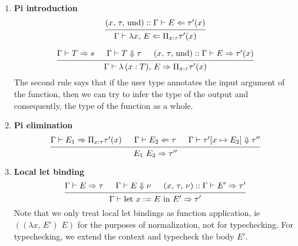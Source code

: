\documentclass{article}
\begin{document}
\begin{enumerate}
\item \textbf{Pi introduction} \\
  \[
    \begin{prooftree}
      \hypo{(x, \, \tau, \, \text{und}) :: \Gamma \vdash E \Leftarrow \tau'(x)}
      \infer1{\Gamma \vdash \lambda x, \, E \Leftarrow \Pi_{x : \tau}\tau'(x)}
    \end{prooftree}
  \]

  \[
    \begin{prooftree}
      \hypo{\Gamma \vdash T \Rightarrow s}
      \hypo{\Gamma \vdash T \Downarrow \tau}
      \hypo{(x, \, \tau, \, \text{und}) :: \Gamma \vdash E \Rightarrow \tau'(x)}
      \infer3{\Gamma \vdash \lambda \, (x : T), \, E \Rightarrow \Pi_{x : \tau}\tau'(x)}
    \end{prooftree}
  \]
  The second rule says that if the user type annotates the input argument of
  the function, then we can try to infer the type of the output and
  consequently, the type of the function as a whole.

\item \textbf{Pi elimination} \\
  \[
    \begin{prooftree}
      \hypo{\Gamma \vdash E_1 \Rightarrow \Pi_{x : \tau}\tau'(x)}
      \hypo{\Gamma \vdash E_2 \Leftarrow \tau}
      \hypo{\Gamma \vdash \tau'[x \mapsto E_2] \Downarrow \tau''}
      \infer3{E_1 \,\, E_2 \Rightarrow \tau''}
    \end{prooftree}
  \]

\item \textbf{Local let binding} \\
  \[
    \begin{prooftree}
      \hypo{\Gamma \vdash E \Rightarrow \tau}
      \hypo{\Gamma \vdash E \Downarrow \nu}
      \hypo{(x, \, \tau, \, \nu) :: \Gamma \vdash E' \Rightarrow \tau'}
      \infer3{\Gamma \vdash \text{let } x := E \text{ in } E' \Rightarrow \tau'}
    \end{prooftree}
  \]
  Note that we only treat local let bindings as function application, ie
  $((\lambda x, \, E') \,\, E)$ for the purposes of normalization, not for 
  typechecking.
  For typechecking, we extend the context and typecheck the body $E'$. 


\end{enumerate}
\end{document}
